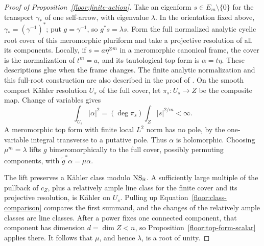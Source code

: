 \begin{proof}[Proof of Proposition~\ref{floor:finite-action}]
Take an eigenform \(s\in E_m\setminus\{0\}\) for the transport
\(\gamma_*\) of one self-arrow, with eigenvalue \(\lambda\).  In the
orientation fixed above, \(\gamma_*=(\gamma^{-1})^*\); put
\(g=\gamma^{-1}\), so \(g^*s=\lambda s\).  Form the full normalized analytic cyclic root
cover of this meromorphic pluriform and take a projective resolution of
all its components.  Locally, if \(s=a\eta^{\otimes m}\) in a
meromorphic canonical frame, the cover is the normalization of
\(t^m=a\), and its tautological top form is \(\alpha=t\eta\).
These descriptions glue when the frame changes.  The finite analytic
normalization and this full-root construction are also described in the
proof of \cite[Lemma~7.1]{BL}.  On the smooth compact K\"ahler resolution
\(U_s\) of the full cover, let \(\pi_s:U_s\to Z\) be the composite map.
Change of variables gives
\[
 \int_{U_s}|\alpha|^2=(\deg\pi_s)\int_Z|s|^{2/m}<\infty.
\]
A meromorphic top form with finite local \(L^2\) norm has no pole, by
the one-variable integral transverse to a putative pole.  Thus \(\alpha\)
is holomorphic.  Choosing \(\mu^m=\lambda\) lifts \(g\)
bimeromorphically to the full cover, possibly permuting components, with
\(\widetilde g^*\alpha=\mu\alpha\).

The lift preserves a K\"ahler class modulo \(\operatorname{NS}_\mathbb R\).  A sufficiently
large multiple of the pullback of \(c_Z\), plus a relatively ample line
class for the finite cover and its projective resolution, is K\"ahler on
\(U_s\).  Pulling up Equation~\eqref{floor:class-comparison} compares the first
summand, and the changes of the relatively ample classes are line classes.
After a power fixes one connected component, that component has dimension
\(d=\dim Z<n\), so Proposition~\ref{floor:top-form-scalar} applies there.
It follows that
\(\mu\), and hence \(\lambda\), is a root of unity.


\end{proof}
